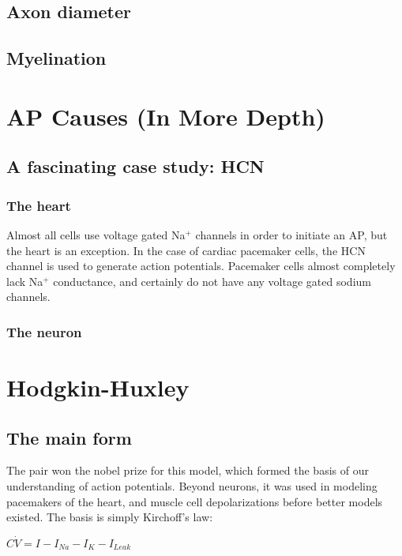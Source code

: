 \documentclass[12pt]{amsart}
\begin{document}
\subsection{Axon diameter}
\subsection{Myelination}


\section{AP Causes (In More Depth)}
\subsection{A fascinating case study: HCN}
\subsubsection{The heart} Almost all cells use voltage gated Na$^+$ channels in order to initiate an AP, but the heart is an exception. In the case of cardiac pacemaker cells, the HCN channel is used to generate action potentials. Pacemaker cells almost completely lack Na$^+$ conductance, and certainly do not have any voltage gated sodium channels. 

\subsubsection{The neuron}

\section{Hodgkin-Huxley} 

\subsection{The main form} The pair won the nobel prize for this model, which formed the basis of our understanding of action potentials. Beyond neurons, it was used in modeling pacemakers of the heart, and muscle cell depolarizations before better models existed.  The basis is simply Kirchoff's law: 

\bigskip

\begin{center}

    $C\dot{V} = I - I_{Na} - I_{K} - I_{Leak}$
    
\end{center}
\end{document}
